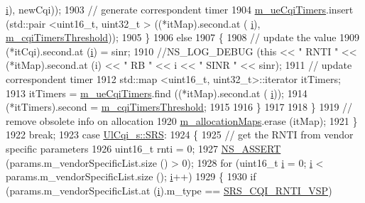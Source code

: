 \begin{DoxyCode}
      \hyperlink{bernuolliDistribution_8m_a6f6ccfcf58b31cb6412107d9d5281426}{i}), newCqi));
1903                 \textcolor{comment}{// generate correspondent timer}
1904                 \hyperlink{classns3_1_1TtaFfMacScheduler_adb17b15e869d53e4244bf77f3f842f67}{m\_ueCqiTimers}.insert (std::pair <uint16\_t, uint32\_t > ((*itMap).second.at (
      \hyperlink{bernuolliDistribution_8m_a6f6ccfcf58b31cb6412107d9d5281426}{i}), \hyperlink{classns3_1_1TtaFfMacScheduler_a3dd8aa322782db3d0f2bbaf9fede6fca}{m\_cqiTimersThreshold}));
1905               \}
1906             \textcolor{keywordflow}{else}
1907               \{
1908                 \textcolor{comment}{// update the value}
1909                 (*itCqi).second.at (\hyperlink{bernuolliDistribution_8m_a6f6ccfcf58b31cb6412107d9d5281426}{i}) = sinr;
1910                 \textcolor{comment}{//NS\_LOG\_DEBUG (this << " RNTI " << (*itMap).second.at (i) << " RB " << i << " SINR " <<
       sinr);}
1911                 \textcolor{comment}{// update correspondent timer}
1912                 std::map <uint16\_t, uint32\_t>::iterator itTimers;
1913                 itTimers = \hyperlink{classns3_1_1TtaFfMacScheduler_adb17b15e869d53e4244bf77f3f842f67}{m\_ueCqiTimers}.find ((*itMap).second.at (
      \hyperlink{bernuolliDistribution_8m_a6f6ccfcf58b31cb6412107d9d5281426}{i}));
1914                 (*itTimers).second = \hyperlink{classns3_1_1TtaFfMacScheduler_a3dd8aa322782db3d0f2bbaf9fede6fca}{m\_cqiTimersThreshold};
1915 
1916               \}
1917 
1918           \}
1919         \textcolor{comment}{// remove obsolete info on allocation}
1920         \hyperlink{classns3_1_1TtaFfMacScheduler_a8931533e6964833d4e1da1e8c6d20313}{m\_allocationMaps}.erase (itMap);
1921       \}
1922       \textcolor{keywordflow}{break};
1923     \textcolor{keywordflow}{case} \hyperlink{structns3_1_1UlCqi__s_aece9e5ebea42eb9ff1744c72c8459b57af4b6dba4243636562c910c4d4761dd7e}{UlCqi\_s::SRS}:
1924       \{
1925         \textcolor{comment}{// get the RNTI from vendor specific parameters}
1926         uint16\_t rnti = 0;
1927         \hyperlink{assert_8h_a6dccdb0de9b252f60088ce281c49d052}{NS\_ASSERT} (params.m\_vendorSpecificList.size () > 0);
1928         \textcolor{keywordflow}{for} (uint16\_t \hyperlink{bernuolliDistribution_8m_a6f6ccfcf58b31cb6412107d9d5281426}{i} = 0; \hyperlink{bernuolliDistribution_8m_a6f6ccfcf58b31cb6412107d9d5281426}{i} < params.m\_vendorSpecificList.size (); \hyperlink{bernuolliDistribution_8m_a6f6ccfcf58b31cb6412107d9d5281426}{i}++)
1929           \{
1930             \textcolor{keywordflow}{if} (params.m\_vendorSpecificList.at (\hyperlink{bernuolliDistribution_8m_a6f6ccfcf58b31cb6412107d9d5281426}{i}).m\_type == \hyperlink{lte-vendor-specific-parameters_8h_a3b5e6e766032ab4a8e374a1cfd237a26}{SRS\_CQI\_RNTI\_VSP})

\end{DoxyCode}
